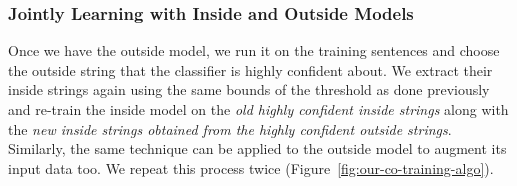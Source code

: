 \documentclass[11pt]{article}
\begin{document}
\subsubsection{Jointly Learning with Inside and Outside Models}
\label{ssec:joint-inside-outside}
Once we have the outside model, we run it on the training sentences and choose the outside string that the classifier is highly confident about. We extract their inside strings again using the same bounds of the threshold as done previously and re-train the inside model on the \emph{old highly confident inside strings} along with the \emph{new inside strings obtained from the highly confident outside strings}. Similarly, the same technique can be applied to the outside model to augment its input data too. We repeat this process twice (Figure~\ref{fig:our-co-training-algo}).
\end{document}

